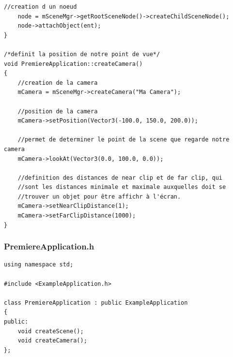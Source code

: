 \begin{lstlisting}[caption={PremiereApplication.cpp: Cr\'eation de la cam\'era}]
    //creation d un noeud
    node = mSceneMgr->getRootSceneNode()->createChildSceneNode();
    node->attachObject(ent);
}

/*definit la position de notre point de vue*/
void PremiereApplication::createCamera()
{
    //creation de la camera
    mCamera = mSceneMgr->createCamera("Ma Camera");

    //position de la camera
    mCamera->setPosition(Vector3(-100.0, 150.0, 200.0));

    //permet de determiner le point de la scene que regarde notre camera
    mCamera->lookAt(Vector3(0.0, 100.0, 0.0));

    //definition des distances de near clip et de far clip, qui
    //sont les distances minimale et maximale auxquelles doit se
    //trouver un objet pour être affichr à l'écran.
    mCamera->setNearClipDistance(1);
    mCamera->setFarClipDistance(1000);
}

\end{lstlisting}



\subsubsection{PremiereApplication.h}
\begin{lstlisting}[caption={PremiereApplication.h: Cr\'eation de la cam\'era}]
using namespace std;

#include <ExampleApplication.h>

class PremiereApplication : public ExampleApplication
{
public:
    void createScene();
    void createCamera();
};

\end{lstlisting}



